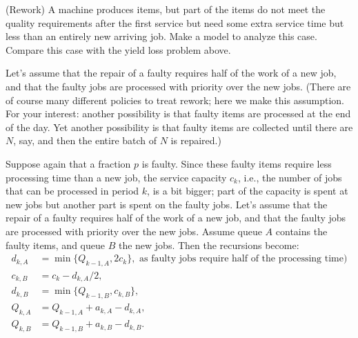 \begin{question}
  (Rework) A machine produces items, but part of the items do not meet
  the quality requirements after the first service but need some extra
  service time but less than an entirely new arriving job. Make a
  model to analyze this case. Compare this case with the yield loss
  problem above. 

  Let's assume that the repair of a faulty requires half of the work
  of a new job, and that the faulty jobs are processed with priority
  over the new jobs. (There are of course many different policies to
  treat rework; here we make this assumption. For your interest:
  another possibility is that faulty items are processed at the end of
  the day. Yet another possibility is that faulty items are collected
  until there are $N$, say, and then the entire batch of $N$ is
  repaired.)

  \begin{solution}
    Suppose again that a fraction $p$ is faulty. Since these faulty
    items require less processing time than a new job, the service
    capacity $c_k$, i.e., the number of jobs that can be processed in
    period $k$, is a bit bigger; part of the capacity is spent at new
    jobs but another part is spent on the faulty jobs. Let's assume
    that the repair of a faulty requires half of the work of a new
    job, and that the faulty jobs are processed with priority over the
    new jobs. Assume queue $A$ contains the faulty items, and queue
    $B$ the new jobs. Then the recursions become:
\begin{equation*}
  \begin{split}
    d_{k,A} &= \min\{Q_{k-1, A}, 2c_k\}, \text{ as faulty jobs require half of the processing time})\\
    c_{k,B} &= c_k - d_{k,A}/2, \\
    d_{k,B} &= \min\{Q_{k-1, B}, c_{k,B}\}, \\
    Q_{k,A} &= Q_{k-1, A} + a_{k,A} - d_{k,A}, \\
    Q_{k,B} &= Q_{k-1, B} + a_{k,B} - d_{k,B}.
  \end{split}
\end{equation*}

  \end{solution}
\end{question}


